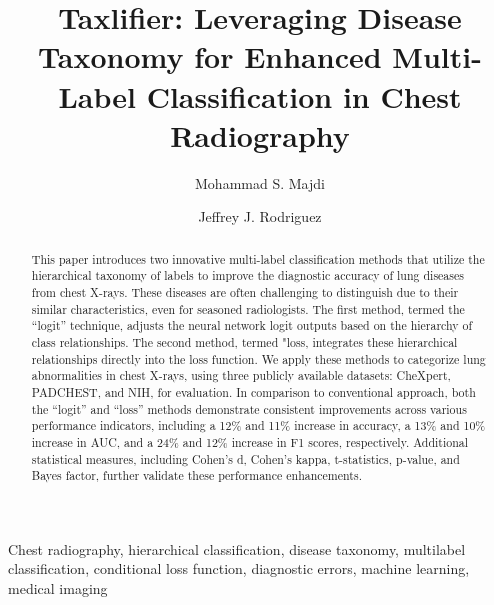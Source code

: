 \documentclass[review,1p,times,numbers]{elsarticle}
\begin{document}
\begin{frontmatter}

    \title{Taxlifier: Leveraging Disease Taxonomy for Enhanced Multi-Label Classification in Chest Radiography}
    \author[]{Mohammad S\@. Majdi}
    \author[]{Jeffrey J\@. Rodriguez}

    \begin{abstract}
        This paper introduces two innovative multi-label classification methods that utilize the hierarchical taxonomy of labels to improve the diagnostic accuracy of lung diseases from chest X-rays. These diseases are often challenging to distinguish due to their similar characteristics, even for seasoned radiologists. The first method, termed the ``logit'' technique, adjusts the neural network logit outputs based on the hierarchy of class relationships. The second method, termed "loss, integrates these hierarchical relationships directly into the loss function. We apply these methods to categorize lung abnormalities in chest X-rays, using three publicly available datasets: CheXpert, PADCHEST, and NIH, for evaluation.
        In comparison to conventional approach, both the ``logit'' and ``loss'' methods demonstrate consistent improvements across various performance indicators, including a 12\% and 11\% increase in accuracy, a 13\% and 10\% increase in AUC, and a 24\% and 12\% increase in F1 scores, respectively. Additional statistical measures, including Cohen's d, Cohen's kappa, t-statistics, p-value, and Bayes factor, further validate these performance enhancements.
    \end{abstract}
    \begin{keyword}
        Chest radiography, hierarchical classification, disease taxonomy, multilabel classification, conditional loss function, diagnostic errors, machine learning, medical imaging
    \end{keyword}


\end{frontmatter}
\end{document}
